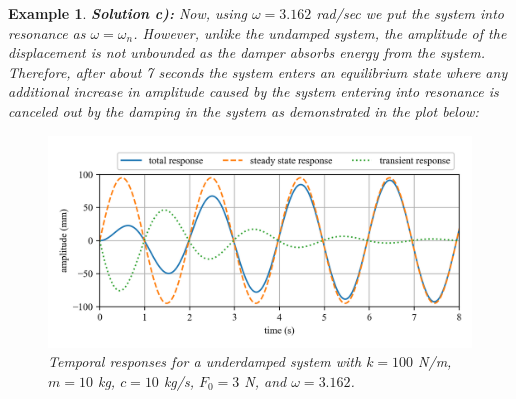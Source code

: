 \documentclass[12pt,letter]{article}
\newtheorem{ex}{Example}
\numberwithin{ex}{section} %
\newenvironment{example}{\begin{mdframed}[middlelinewidth=0.5mm]\begin{ex}\normalfont}{\end{ex}\end{mdframed}}
\numberwithin{re}{section} %
\numberwithin{vcs}{section} %
\begin{document}
\begin{example}
				\noindent\textbf{Solution c):} Now, using $\omega=3.162$ rad/sec we put the system into resonance as $\omega=\omega_n$. However, unlike the undamped system, the amplitude of the displacement is not unbounded as the damper absorbs energy from the system. Therefore, after about 7 seconds the system enters an equilibrium state where any additional increase in amplitude caused by the system entering into resonance is canceled out by the damping in the system as demonstrated in the plot below:
				\begin{figure}[H]
					\centering
					\includegraphics[]{../figures/homogeneous_and_particular_solutions_in_resonance_c.png}
					\caption{Temporal responses for a underdamped system with $k=100$ N/m, $m=10$ kg,  $c=10$ kg/s, $F_0=3$ N, and $\omega = 3.162$.}
				\end{figure}				
			\end{example}	
\end{document}
